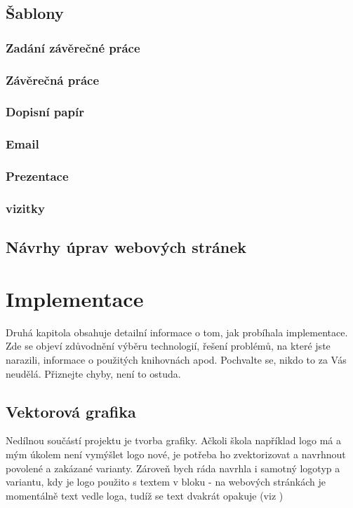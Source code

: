 \documentclass[11pt,a4paper,twoside,openright]{report}
\begin{document}

\section{Šablony}
\subsection{Zadání závěrečné práce}
\subsection{Závěrečná práce}
\subsection{Dopisní papír}
\subsection{Email}
\subsection{Prezentace}
\subsection{vizitky}
\section{Návrhy úprav webových stránek}



\chapter{Implementace}

Druhá kapitola obsahuje detailní informace o tom, jak probíhala implementace. Zde se objeví zdůvodnění výběru technologií, řešení problémů, na které jste narazili, informace o použitých knihovnách apod. Pochvalte se, nikdo to za Vás neudělá. Přiznejte chyby, není to ostuda.

\section{Vektorová grafika}
\label{sec:grafika}
Nedílnou součástí projektu je tvorba grafiky. Ačkoli škola například logo má a mým úkolem není vymýšlet logo nové, je potřeba ho zvektorizovat a navrhnout povolené a zakázané varianty. Zároveň bych ráda navrhla i samotný logotyp a variantu, kdy je logo použito s textem v bloku - na webových stránkách je momentálně text vedle loga, tudíž se text dvakrát opakuje (viz )
\end{document}
